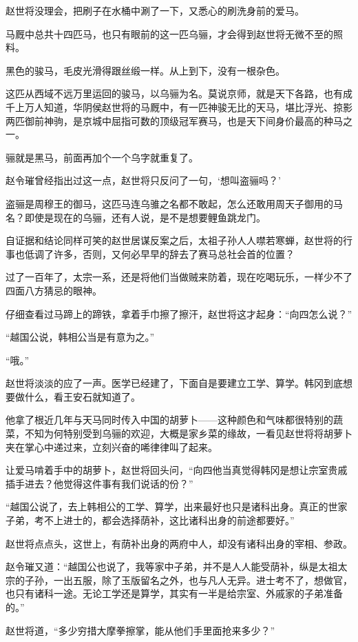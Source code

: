 赵世将没理会，把刷子在水桶中涮了一下，又悉心的刷洗身前的爱马。

马厩中总共十四匹马，也只有眼前的这一匹乌骊，才会得到赵世将无微不至的照料。

黑色的骏马，毛皮光滑得跟丝缎一样。从上到下，没有一根杂色。

这匹从西域不远万里运回的骏马，以乌骊为名。莫说京师，就是天下各路，也有成千上万人知道，华阴侯赵世将的马厩中，有一匹神骏无比的天马，堪比浮光、掠影两匹御前神驹，是京城中屈指可数的顶级冠军赛马，也是天下间身价最高的种马之一。

骊就是黑马，前面再加个一个乌字就重复了。

赵令璀曾经指出过这一点，赵世将只反问了一句，‘想叫盗骊吗？’

盗骊是周穆王的御马，这匹马连乌骓之名都不敢起，怎么还敢用周天子御用的马名？即使是现在的乌骊，还有人说，是不是想要鲤鱼跳龙门。

自证据和结论同样可笑的赵世居谋反案之后，太祖子孙人人噤若寒蝉，赵世将的行事也低调了许多，否则，又何必早早的辞去了赛马总社会首的位置？

过了一百年了，太宗一系，还是将他们当做贼来防着，现在吃喝玩乐，一样少不了四面八方猜忌的眼神。

仔细查看过马蹄上的蹄铁，拿着手巾擦了擦汗，赵世将这才起身：“向四怎么说？”

“越国公说，韩相公当是有意为之。”

“哦。”

赵世将淡淡的应了一声。医学已经建了，下面自是要建立工学、算学。韩冈到底想要做什么，看王安石就知道了。

他拿了根近几年与天马同时传入中国的胡萝卜——这种颜色和气味都很特别的蔬菜，不知为何特别受到乌骊的欢迎，大概是家乡菜的缘故，一看见赵世将将胡萝卜夹在掌心中递过来，立刻兴奋的唏律律叫了起来。

让爱马啃着手中的胡萝卜，赵世将回头问，“向四他当真觉得韩冈是想让宗室贵戚插手进去？他觉得这件事有我们说话的份？”

“越国公说了，去上韩相公的工学、算学，出来最好也只是诸科出身。真正的世家子弟，考不上进士的，都会选择荫补，这比诸科出身的前途都要好。”

赵世将点点头，这世上，有荫补出身的两府中人，却没有诸科出身的宰相、参政。

赵令璀又道：“越国公也说了，我等家中子弟，并不是人人能受荫补，纵是太祖太宗的子孙，一出五服，除了玉版留名之外，也与凡人无异。进士考不了，想做官，也只有诸科一途。无论工学还是算学，其实有一半是给宗室、外戚家的子弟准备的。”

赵世将道，“多少穷措大摩拳擦掌，能从他们手里面抢来多少？”


